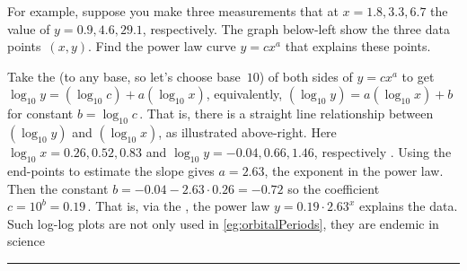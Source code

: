 \begin{table}
\begin{minipage}{\linewidth}
For example, suppose you make three measurements that at $x=1.8,3.3,6.7$ the value of $y=0.9,4.6,29.1$, respectively.  
The graph below-left show the three data points~$(x,y)$.  
Find the power law curve $y=cx^a$ that explains these points.
\begin{center} 
 \hfil
{} 
\end{center}
Take the  (to any base, so let's choose base~$10$) of both sides of $y=cx^a$ to get $\log_{10} y=(\log_{10} c)+a(\log_{10} x)$, equivalently, $(\log_{10} y)=a(\log_{10} x)+b$ for constant $b=\log_{10} c$\,.
That is, there is a straight line relationship between $(\log_{10} y)$ and $(\log_{10} x)$, as illustrated above-right.
Here $\log_{10}x=0.26,0.52,0.83$ and $\log_{10}y=-0.04,0.66,1.46$, respectively \twodp.
Using the end-points to estimate the slope gives $a=2.63$, the exponent in the power law.
Then the constant $b=-0.04-2.63\cdot0.26=-0.72$ so the coefficient $c=10^b=0.19$\,.
That is, via the , the power law $y=0.19\cdot 2.63^x$ explains the data.
Such log-log plots are not only used in \cref{eg:orbitalPeriods}, they are endemic in science 
\end{minipage}
\smallskip\hrule
\end{table}




